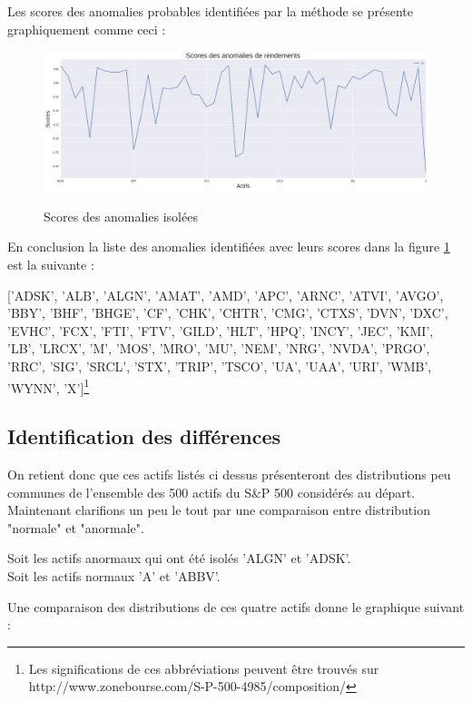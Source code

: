 Les scores des anomalies probables identifiées par la méthode se présente graphiquement comme ceci : 

\begin{figure}[H]
\centering
\caption{Scores des anomalies isolées}
   \includegraphics[scale=0.35]{img/scores_densite.png}
 \label{scoredensite}
\end{figure}

En conclusion la liste des anomalies identifiées avec leurs scores dans la figure \ref{scoredensite} est la suivante : 

['ADSK', 'ALB', 'ALGN', 'AMAT', 'AMD', 'APC', 'ARNC', 'ATVI', 'AVGO',
       'BBY', 'BHF', 'BHGE', 'CF', 'CHK', 'CHTR', 'CMG', 'CTXS', 'DVN', 'DXC',
       'EVHC', 'FCX', 'FTI', 'FTV', 'GILD', 'HLT', 'HPQ', 'INCY', 'JEC', 'KMI',
       'LB', 'LRCX', 'M', 'MOS', 'MRO', 'MU', 'NEM', 'NRG', 'NVDA', 'PRGO',
       'RRC', 'SIG', 'SRCL', 'STX', 'TRIP', 'TSCO', 'UA', 'UAA', 'URI', 'WMB',
       'WYNN', 'X']\footnote{ Les significations de ces abbréviations peuvent être trouvés sur http://www.zonebourse.com/S-P-500-4985/composition/}

\subsection{Identification des différences}

On retient donc que ces actifs listés ci dessus présenteront des distributions peu communes de l'ensemble des 500 actifs du S\&P 500 considérés au départ.
Maintenant clarifions un peu le tout par une comparaison entre distribution "normale" et "anormale".

Soit les actifs anormaux qui ont été isolés 'ALGN' et 'ADSK'. 
\\
Soit les actifs normaux 'A' et 'ABBV'.

Une comparaison des distributions de ces quatre actifs donne le graphique suivant : 

